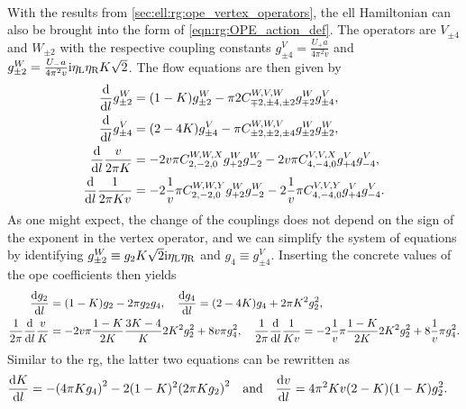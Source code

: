\\
With the results from \autoref{sec:ell:rg:ope_vertex_operators}, the \gls{ell} Hamiltonian can also be brought into the form of \autoref{eqn:rg:OPE_action_def}.
The operators are $V_{\pm 4}$ and $W_{\pm 2}$ with the respective coupling constants $g_{\pm 4}^V = \frac{U_+a}{4\pi^2v}$ and $ g_{\pm 2}^W = \frac{U_-a}{4\pi^2v} \text{i} \eta_{\text{L}}\eta_{\text{R}} K\sqrt{2}$.
The flow equations are then given by
\begin{align*}
\frac{\text{d}}{\text{d} l} g_{\pm 2}^W &= (1 - K) g_{\pm 2}^W - \pi 2C^{W,V,W}_{\mp 2, \pm 4, \pm 2} g_{\mp 2}^W g_{\pm 4}^V,\\
\frac{\text{d}}{\text{d} l} g_{\pm 4}^V &= (2 - 4K) g_{\pm 4}^V - \pi C^{W,W,V}_{\pm 2, \pm 2, \pm 4} g_{\pm 2}^W g_{\pm 2}^W,\\
\frac{\text{d}}{\text{d} l} \frac{v}{2\pi K} &= - 2v\pi C^{W,W,X}_{2,-2,0} g_{+2}^W g_{-2}^W - 2v\pi C^{V,V,X}_{4,-4,0} g_{+4}^V g_{-4}^V,\\
\frac{\text{d}}{\text{d} l} \frac{1}{2\pi Kv} &= - 2\frac{1}{v} \pi C^{W,W,Y}_{2,-2,0} g_{+2}^W g_{-2}^W - 2\frac{1}{v} \pi C^{V,V,Y}_{4,-4,0} g_{+4}^V g_{-4}^V.
\end{align*}
As one might expect, the change of the couplings does not depend on the sign of the exponent in the vertex operator, and we can simplify the system of equations by identifying $g_{\pm 2}^W \equiv g_2 K\sqrt{2} \text{i}\eta_{\text{L}} \eta_{\text{R}}$ and $g_4 \equiv g_{\pm 4}^V$.
Inserting the concrete values of the \gls{ope} coefficients then yields
\begin{align*}
\frac{\text{d} g_2}{\text{d} l} &= (1 - K) g_2 - 2\pi g_2 g_4,\quad \frac{\text{d} g_4}{\text{d} l} = (2 - 4K) g_4 + 2\pi K^2 g_2^2,\\
\frac{1}{2\pi} \frac{\text{d}}{\text{d} l} \frac{v}{K} &= -2v\pi \frac{1-K}{2K} \frac{3K-4}{K} 2K^2 g_2^2 + 8v\pi g_4^2,\quad \frac{1}{2\pi} \frac{\text{d}}{\text{d} l} \frac{1}{Kv} = - 2\frac{1}{v} \pi \frac{1-K}{2K} 2K^2 g_2^2 + 8\frac{1}{v} \pi g_4^2.
\end{align*}
Similar to the \tms{} \gls{rg}, the latter two equations can be rewritten as
\begin{align*}
\frac{\d K}{\d l} &= -\kla*{4\pi Kg_4}^2 - 2 (1-K)^2 \kla*{2\pi K g_2}^2 \quad \text{and} \quad
\frac{\d v}{\d l} = 4\pi^2 Kv (2-K) (1-K) g_2^2.
\end{align*}
